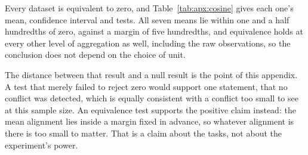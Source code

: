 

Every dataset is equivalent to zero, and Table~\ref{tab:apx:cosine} gives each one's mean, confidence
interval and tests. All seven means lie within one and a half hundredths of zero, against a margin of
five hundredths, and equivalence holds at every other level of aggregation as well, including the raw
observations, so the conclusion does not depend on the choice of unit.

The distance between that result and a null result is the point of this appendix. %
A test that merely
failed to reject zero would support one statement, that no conflict was detected, which is equally
consistent with a conflict too small to see at this sample size. An equivalence test supports the
positive claim instead: the mean alignment lies inside a margin fixed in advance, so whatever
alignment is there is too small to matter. That is a claim about the tasks, not about the
experiment's power.

